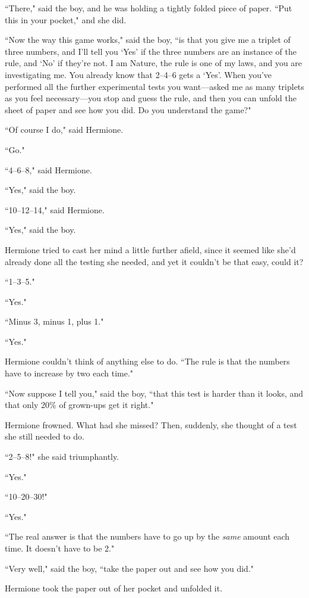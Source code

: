 ``There," said the boy, and he was holding a tightly folded piece of paper. ``Put this in your pocket," and she did.

``Now the way this game works," said the boy, ``is that you give me a triplet of three numbers, and I'll tell you `Yes' if the three numbers are an instance of the rule, and `No' if they're not. I am Nature, the rule is one of my laws, and you are investigating me. You already know that 2--4--6 gets a `Yes'. When you've performed all the further experimental tests you want—asked me as many triplets as you feel necessary—you stop and guess the rule, and then you can unfold the sheet of paper and see how you did. Do you understand the game?"

``Of course I do," said Hermione.

``Go."

``4--6--8," said Hermione.

``Yes," said the boy.

``10--12--14," said Hermione.

``Yes," said the boy.

Hermione tried to cast her mind a little further afield, since it seemed like she'd already done all the testing she needed, and yet it couldn't be that easy, could it?

``1--3--5."

``Yes."

``Minus 3, minus 1, plus 1."

``Yes."

Hermione couldn't think of anything else to do. ``The rule is that the numbers have to increase by two each time."

``Now suppose I tell you," said the boy, ``that this test is harder than it looks, and that only 20\% of grown-ups get it right."

Hermione frowned. What had she missed? Then, suddenly, she thought of a test she still needed to do.

``2--5--8!" she said triumphantly.

``Yes."

``10--20--30!"

``Yes."

``The real answer is that the numbers have to go up by the \emph{same} amount each time. It doesn't have to be 2."

``Very well," said the boy, ``take the paper out and see how you did."

Hermione took the paper out of her pocket and unfolded it.

